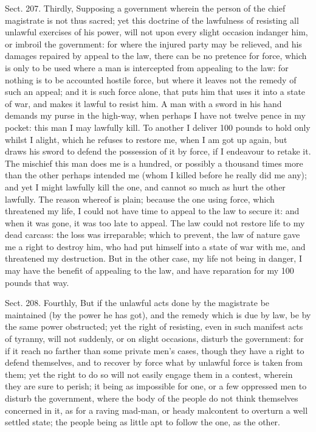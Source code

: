 \documentclass[11pt,openany]{book}
\begin{document}
Sect. 207. Thirdly, Supposing a government wherein the person of the chief magistrate is not thus sacred; yet this doctrine of the lawfulness of resisting all unlawful exercises of his power, will not upon every slight occasion indanger him, or imbroil the government: for where the injured party may be relieved, and his damages repaired by appeal to the law, there can be no pretence for force, which is only to be used where a man is intercepted from appealing to the law: for nothing is to be accounted hostile force, but where it leaves not the remedy of such an appeal; and it is such force alone, that puts him that uses it into a state of war, and makes it lawful to resist him. A man with a sword in his hand demands my purse in the high-way, when perhaps I have not twelve pence in my pocket: this man I may lawfully kill. To another I deliver 100 pounds to hold only whilst I alight, which he refuses to restore me, when I am got up again, but draws his sword to defend the possession of it by force, if I endeavour to retake it. The mischief this man does me is a hundred, or possibly a thousand times more than the other perhaps intended me (whom I killed before he really did me any); and yet I might lawfully kill the one, and cannot so much as hurt the other lawfully. The reason whereof is plain; because the one using force, which threatened my life, I could not have time to appeal to the law to secure it: and when it was gone, it was too late to appeal. The law could not restore life to my dead carcass: the loss was irreparable; which to prevent, the law of nature gave me a right to destroy him, who had put himself into a state of war with me, and threatened my destruction. But in the other case, my life not being in danger, I may have the benefit of appealing to the law, and have reparation for my 100 pounds that way.

Sect. 208. Fourthly, But if the unlawful acts done by the magistrate be maintained (by the power he has got), and the remedy which is due by law, be by the same power obstructed; yet the right of resisting, even in such manifest acts of tyranny, will not suddenly, or on slight occasions, disturb the government: for if it reach no farther than some private men's cases, though they have a right to defend themselves, and to recover by force what by unlawful force is taken from them; yet the right to do so will not easily engage them in a contest, wherein they are sure to perish; it being as impossible for one, or a few oppressed men to disturb the government, where the body of the people do not think themselves concerned in it, as for a raving mad-man, or heady malcontent to overturn a well settled state; the people being as little apt to follow the one, as the other.
\end{document}
